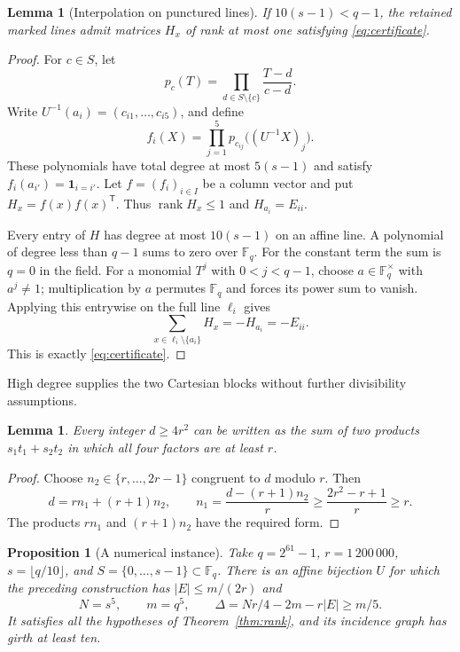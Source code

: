 \documentclass[11pt]{amsart}
\newtheorem{proposition}[theorem]{Proposition}
\newtheorem{lemma}[theorem]{Lemma}
\theoremstyle{definition}
\theoremstyle{remark}
\numberwithin{equation}{section}
\newcommand{\F}{\mathbb F}
\DeclareMathOperator{\rank}{rank}
\begin{document}
\begin{lemma}[Interpolation on punctured lines]\label{lem:interpolation}
If $10(s-1)<q-1$, the retained marked lines admit matrices $H_x$
of rank at most one satisfying \eqref{eq:certificate}.
\end{lemma}

\begin{proof}
For $c\in S$, let
\[
 p_c(T)=\prod_{d\in S\setminus\{c\}}\frac{T-d}{c-d}.
\]
Write $U^{-1}(a_i)=(c_{i1},\ldots,c_{i5})$, and define
\[
 f_i(X)=\prod_{j=1}^5p_{c_{ij}}\bigl((U^{-1}X)_j\bigr).
\]
These polynomials have total degree at most $5(s-1)$ and satisfy
$f_i(a_{i'})=\mathbf1_{i=i'}$. Let $f=(f_i)_{i\in I}$ be a column
vector and put $H_x=f(x)f(x)^{\mathsf T}$. Thus
$\rank H_x\le1$ and $H_{a_i}=E_{ii}$.

Every entry of $H$ has degree at most $10(s-1)$ on an affine line.
A polynomial of degree less than $q-1$ sums to zero over $\F_q$.
For the constant term the sum is $q=0$ in the field. For a monomial
$T^j$ with $0<j<q-1$, choose $a\in\F_q^\times$ with $a^j\ne1$;
multiplication by $a$ permutes $\F_q$ and forces its power sum to
vanish. Applying this entrywise on the full line $\ell_i$ gives
\[
 \sum_{x\in\ell_i\setminus\{a_i\}}H_x
 =-H_{a_i}=-E_{ii}.
\]
This is exactly \eqref{eq:certificate}.
\end{proof}

High degree supplies the two Cartesian blocks without further
divisibility assumptions.

\begin{lemma}\label{lem:partition}
Every integer $d\ge4r^2$ can be written as the sum of two products
$s_1t_1+s_2t_2$ in which all four factors are at least $r$.
\end{lemma}

\begin{proof}
Choose $n_2\in\{r,\ldots,2r-1\}$ congruent to $d$ modulo $r$.
Then
\[
 d=r n_1+(r+1)n_2,\qquad
 n_1=\frac{d-(r+1)n_2}{r}
 \ge\frac{2r^2-r+1}{r}\ge r.
\]
The products $r n_1$ and $(r+1)n_2$ have the required form.
\end{proof}

\begin{proposition}[A numerical instance]\label{prop:instance}
Take $q=2^{61}-1$, $r=1\,200\,000$,
$s=\lfloor q/10\rfloor$, and $S=\{0,\ldots,s-1\}\subset\F_q$.
There is an affine bijection $U$ for which the preceding construction
has $|E|\le m/(2r)$ and
\begin{equation}\label{eq:positive-gap}
 N=s^5,\qquad m=q^5,\qquad
 \Delta=Nr/4-2m-r|E|\ge m/5.
\end{equation}
It satisfies all the hypotheses of Theorem~\ref{thm:rank}, and its
incidence graph has girth at least ten.
\end{proposition}
\end{document}
